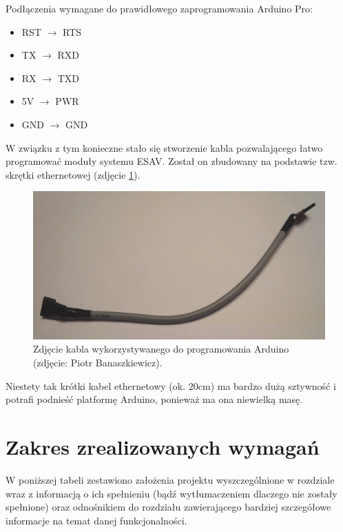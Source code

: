 Podłączenia wymagane do prawidłowego zaprogramowania Arduino Pro:

\begin{itemize}
\item RST $\rightarrow$ RTS
\item TX $\rightarrow$ RXD
\item RX $\rightarrow$ TXD
\item 5V $\rightarrow$ PWR
\item GND $\rightarrow$ GND
\end{itemize}

W związku z tym konieczne stało się stworzenie kabla pozwalającego łatwo programować moduły systemu ESAV. Został on zbudowany na podstawie tzw. skrętki ethernetowej (zdjęcie \ref{fig:cable}).

\begin{figure}[h]
	\centering
	\includegraphics[scale=0.3]{pics/cable.jpg}
	\caption{\label{fig:cable}Zdjęcie kabla wykorzystywanego do programowania Arduino (zdjęcie: Piotr Banaszkiewicz).}
\end{figure}

Niestety tak krótki kabel ethernetowy (ok. $20\mathrm{cm}$) ma bardzo dużą sztywność i potrafi podnieść platformę Arduino, ponieważ ma ona niewielką masę.


\section{Zakres zrealizowanych wymagań}
\label{sec:zrealizowane_wymagania}

W poniższej tabeli zestawiono założenia projektu wyszczególnione w rozdziale wraz z informacją o ich spełnieniu (bądź wytłumaczeniem dlaczego nie zostały spełnione) oraz odnośnikiem do rozdziału zawierającego bardziej szczegółowe informacje na temat danej funkcjonalności.

